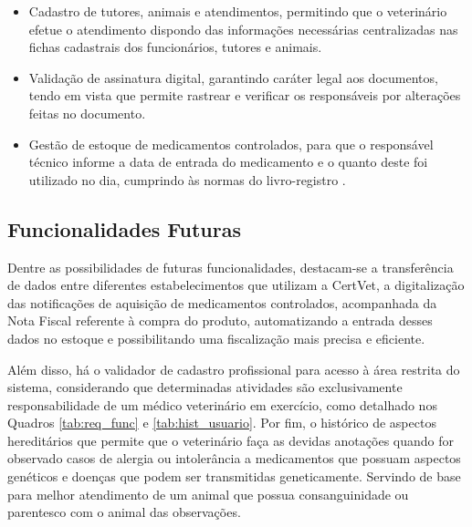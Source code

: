 \documentclass[
    12pt,               %
    openright,          %
    oneside,
    a4paper,            %
    BIBLATEX,           %
    TODO,               %
    english,            %
    brazil              %
    ]{ifsp-spo-inf-ctds}
\begin{document}
        \begin{itemize}
            \item Cadastro de tutores, animais e atendimentos, permitindo que o veterinário efetue o atendimento dispondo das informações necessárias centralizadas nas fichas cadastrais dos funcionários, tutores e animais.
            \item Validação de assinatura digital, garantindo caráter legal aos documentos, tendo em vista que permite rastrear e verificar os responsáveis por alterações feitas no documento. 
            \item Gestão de estoque de medicamentos controlados, para que o responsável técnico informe a data de entrada do medicamento e o quanto deste foi utilizado no dia, cumprindo às normas do livro-registro .
        \end{itemize}

        \subsection{Funcionalidades Futuras}
        \label{subcap:funcionalidades-futuras}
            
            Dentre as possibilidades de futuras funcionalidades, destacam-se a transferência de dados entre diferentes  estabelecimentos que utilizam a CertVet, a digitalização das notificações de aquisição de medicamentos controlados, acompanhada da Nota Fiscal referente à compra do produto, automatizando a entrada desses dados no estoque e possibilitando uma fiscalização mais precisa e eficiente.
            
            Além disso, há o validador de cadastro profissional para acesso à área restrita do sistema, considerando que determinadas atividades são exclusivamente responsabilidade de um médico veterinário em exercício, como detalhado nos Quadros \ref{tab:req_func} e \ref{tab:hist_usuario}. Por fim, o histórico de aspectos hereditários que permite que o veterinário faça as devidas anotações quando for observado casos de alergia ou intolerância a medicamentos que possuam aspectos genéticos e doenças que podem ser transmitidas geneticamente. Servindo de base para melhor atendimento de um animal que possua consanguinidade ou parentesco com o animal das observações.
        
\end{document}
